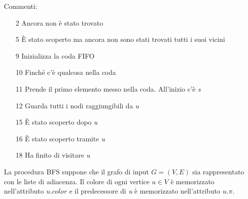 \documentclass[10pt, a4paper]{report}
\begin{document}
Commenti:
\begin{enumerate}
\item[2]Ancora non è stato trovato
\item[5]È stato scoperto ma ancora non sono stati trovati tutti i suoi vicini
\item[9]Inizializza la coda \textsc{FIFO}
\item[10]Finché c'è qualcosa nella coda
\item[11]Prende il primo elemento messo nella coda. All'inizio c'è \textit{s}
\item[12]Guarda tutti i nodi raggiungibili da \textit{u}
\item[15]È stato scoperto dopo \textit{u}
\item[16]È stato scoperto tramite \textit{u}
\item[18]Ha finito di visitare \textit{u}
\end{enumerate}
La procedura \textsc{BFS} suppone che il grafo di input $G = (V,E)$ sia rappresentato con le liste di adiacenza. Il colore di ogni vertice $u \in V$ è memorizzato nell'attributo $u.color$ e il predecessore di \textit{u} è memorizzato nell'attributo $u.\pi$.
\end{document}
